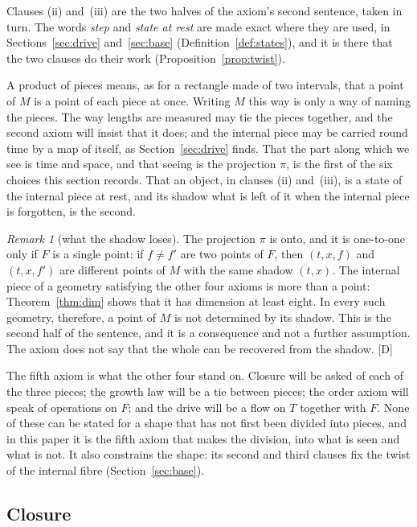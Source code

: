 \documentclass[11pt,a4paper]{article}
\theoremstyle{plain}
\theoremstyle{definition}
\theoremstyle{remark}
\newtheorem{remark}[theorem]{Remark}
\newcommand{\rigD}{[\textup{D}]}
\begin{document}
Clauses (ii) and~(iii) are the two halves of the axiom's second sentence, taken in turn. The words \emph{step} and \emph{state at rest} are made exact where they are used, in Sections~\ref{sec:drive} and~\ref{sec:base} (Definition~\ref{def:states}), and it is there that the two clauses do their work (Proposition~\ref{prop:twist}).

A product of pieces means, as for a rectangle made of two intervals, that a point of $M$ is a point of each piece at once. Writing $M$ this way is only a way of naming the pieces. The way lengths are measured may tie the pieces together, and the second axiom will insist that it does; and the internal piece may be carried round time by a map of itself, as Section~\ref{sec:drive} finds. That the part along which we see is time and space, and that seeing is the projection $\pi$, is the first of the six choices this section records. That an object, in clauses (ii) and~(iii), is a state of the internal piece at rest, and its shadow what is left of it when the internal piece is forgotten, is the second.

\begin{remark}[what the shadow loses]\label{rem:loss}
The projection $\pi$ is onto, and it is one-to-one only if $F$ is a single point: if $f\neq f'$ are two points of $F$, then $(t,x,f)$ and $(t,x,f')$ are different points of $M$ with the same shadow $(t,x)$. The internal piece of a geometry satisfying the other four axioms is more than a point: Theorem~\ref{thm:dim} shows that it has dimension at least eight. In every such geometry, therefore, a point of $M$ is not determined by its shadow. This is the second half of the sentence, and it is a consequence and not a further assumption. The axiom does not say that the whole can be recovered from the shadow. \rigD
\end{remark}

The fifth axiom is what the other four stand on. Closure will be asked of each of the three pieces; the growth law will be a tie between pieces; the order axiom will speak of operations on $F$; and the drive will be a flow on $T$ together with $F$. None of these can be stated for a shape that has not first been divided into pieces, and in this paper it is the fifth axiom that makes the division, into what is seen and what is not. It also constrains the shape: its second and third clauses fix the twist of the internal fibre (Section~\ref{sec:base}).

\subsection{Closure}\label{sec:A1}
\end{document}
